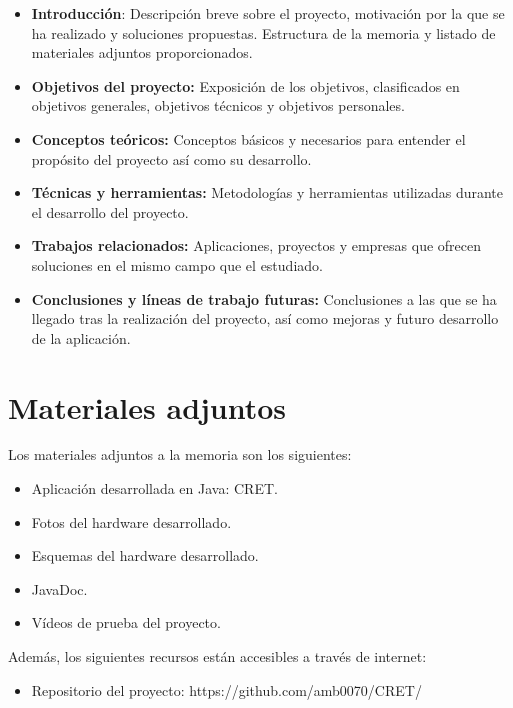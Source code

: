\begin{itemize}

\item

\textbf{Introducción}: Descripción breve sobre el proyecto, motivación por la que se ha realizado y soluciones propuestas. Estructura de la memoria y listado de materiales adjuntos proporcionados.

\item

\textbf{Objetivos del proyecto:} Exposición de los objetivos, clasificados en objetivos generales, objetivos técnicos y objetivos personales.

\item

\textbf{Conceptos teóricos:} Conceptos básicos y necesarios para entender el propósito del proyecto así como su desarrollo.

\item

\textbf{Técnicas y herramientas:} Metodologías y herramientas utilizadas durante el desarrollo del proyecto.

\item

\textbf{Trabajos relacionados:} Aplicaciones, proyectos y empresas que ofrecen soluciones en el mismo campo que el estudiado.

\item

\textbf{Conclusiones y líneas de trabajo futuras:} Conclusiones a las que se ha llegado tras la realización del proyecto, así como mejoras  y futuro desarrollo de la aplicación.

\end{itemize}

\section{Materiales adjuntos}\label{materiales-adjuntos}

Los materiales adjuntos a la memoria son los siguientes:

\begin{itemize}

\item
	Aplicación desarrollada en Java: CRET.
\item	
	Fotos del hardware desarrollado.
\item
	Esquemas del hardware desarrollado.
\item	
	JavaDoc.
\item
	Vídeos de prueba del proyecto.
\end{itemize}

Además, los siguientes recursos están accesibles a través de internet:

\begin{itemize}
\item
  Repositorio del proyecto: https://github.com/amb0070/CRET/
\end{itemize}
